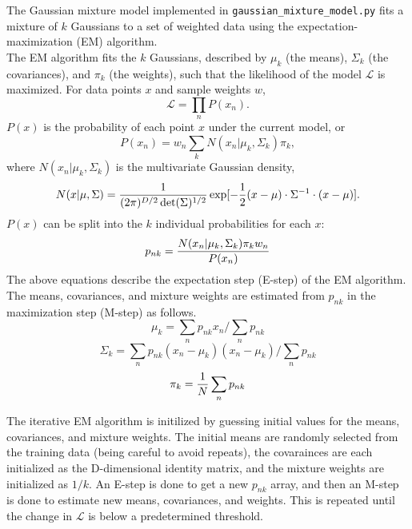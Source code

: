 \documentclass{article}
\begin{document}
The Gaussian mixture model implemented in \texttt{gaussian\_mixture\_model.py}
fits a mixture of $k$ Gaussians to a set of weighted data using the
expectation-maximization (EM) algorithm. \\

The EM algorithm fits the $k$ Gaussians, described by $\mu_k$ (the means),
$\Sigma_k$ (the covariances), and $\pi_k$ (the weights), such that the likelihood
of the model $\mathscr{L}$ is maximized. For data points $x$ and sample weights
$w$,
\begin{equation}
    \mathscr{L} = \prod_n P(x_n).
\end{equation}
$P(x)$ is the probability of each point $x$ under the current model, or
\begin{equation}
    P(x_n) = w_n \sum_{k} N(x_n | \mu_k, \Sigma_k) \pi_k,
\end{equation}
where $N(x_n | \mu_k, \Sigma_k)$ is the multivariate Gaussian density,
\begin{equation}
    N(x | \mu, \Sigma) = {1 \over {(2\pi)^{D/2} \det(\Sigma)^{1/2}}}
    \exp[-{1 \over 2} (x - \mu) \cdot \Sigma^{-1} \cdot (x - \mu)].
\end{equation}
$P(x)$ can be split into the $k$ individual probabilities for each $x$:
\begin{equation}
    p_{nk} = {{N(x_n | \mu_k, \Sigma_k) \pi_k w_n} \over P(x_n)}
\end{equation}
The above equations describe the expectation step (E-step) of the EM
algorithm. The means, covariances, and mixture weights are estimated from
$p_{nk}$ in the maximization step (M-step) as follows.
\begin{equation}
    \mu_k = \sum_{n} p_{nk} x_n \Big/ \sum_{n} p_{nk}
\end{equation}
\begin{equation}
    \Sigma_k = \sum_{n} p_{nk} (x_n - \mu_k) (x_n - \mu_k) \Big/ \sum_{n} p_{nk}
\end{equation}
\begin{equation}
    \pi_k = {1 \over N} \sum_{n} p_{nk}
\end{equation}

The iterative EM algorithm is initilized by guessing initial values for the means,
covariances, and mixture weights. The initial means are randomly selected from the
training data (being careful to avoid repeats), the covarainces are each initialized
as the D-dimensional identity matrix, and the mixture weights are initialized as
$1/k$. An E-step is done to get a new $p_{nk}$ array, and then an M-step is done
to estimate new means, covariances, and weights. This is repeated until the
change in $\mathscr{L}$ is below a predetermined threshold.
\end{document}
